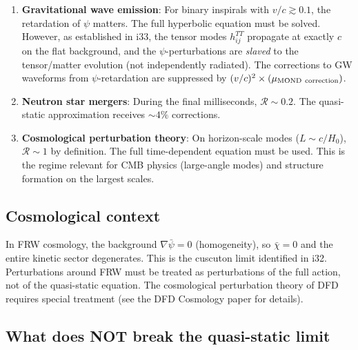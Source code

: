 \documentclass[12pt,a4paper]{article}
\begin{document}
\begin{enumerate}
\item \textbf{Gravitational wave emission}: For binary inspirals with
      $v/c \gtrsim 0.1$, the retardation of $\psi$ matters. The full
      hyperbolic equation must be solved. However, as established in i33,
      the tensor modes $h_{ij}^{TT}$ propagate at exactly $c$ on the flat
      background, and the $\psi$-perturbations are \emph{slaved} to the
      tensor/matter evolution (not independently radiated). The corrections
      to GW waveforms from $\psi$-retardation are suppressed by
      $(v/c)^2 \times (\mu_{\rm MOND~correction})$.

\item \textbf{Neutron star mergers}: During the final milliseconds,
      $\mathcal{R} \sim 0.2$. The quasi-static approximation receives
      $\sim 4\%$ corrections.

\item \textbf{Cosmological perturbation theory}: On horizon-scale modes
      ($L \sim c/H_0$), $\mathcal{R} \sim 1$ by definition. The full
      time-dependent equation must be used. This is the regime relevant
      for CMB physics (large-angle modes) and structure formation on the
      largest scales.
\end{enumerate}

\subsection{Cosmological context}

In FRW cosmology, the background $\nabla\bar\psi = 0$ (homogeneity),
so $\bar\chi = 0$ and the entire kinetic sector degenerates. This is
the cuscuton limit identified in i32. Perturbations around FRW must be
treated as perturbations of the full action, not of the quasi-static
equation. The cosmological perturbation theory of DFD requires special
treatment (see the DFD Cosmology paper for details).

\subsection{What does NOT break the quasi-static limit}
\end{document}
